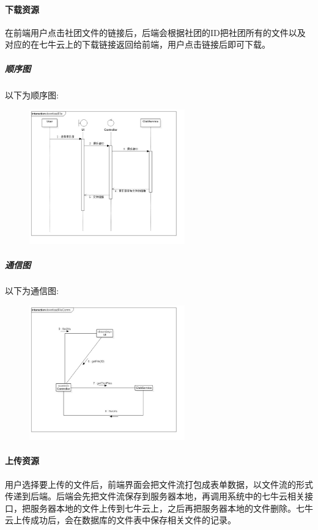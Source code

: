 \documentclass[UTF8]{ctexart}
\begin{document}
\paragraph{下载资源}
在前端用户点击社团文件的链接后，后端会根据社团的ID把社团所有的文件以及对应的在七牛云上的下载链接返回给前端，用户点击链接后即可下载。

\subparagraph*{顺序图}
以下为顺序图:\\
\begin{figure}[H]
\centering
\includegraphics[width = 0.6\textwidth]{downloadFileSeq.jpg}
\end{figure}

\subparagraph*{通信图}
以下为通信图:\\
\begin{figure}[H]
\centering
\includegraphics[width = 0.6\textwidth]{downloadFileComm.jpg}
\end{figure}

\paragraph{上传资源}
用户选择要上传的文件后，前端界面会把文件流打包成表单数据，以文件流的形式传递到后端。后端会先把文件流保存到服务器本地，再调用系统中的七牛云相关接口，把服务器本地的文件上传到七牛云上，之后再把服务器本地的文件删除。七牛云上传成功后，会在数据库的文件表中保存相关文件的记录。
\end{document}
